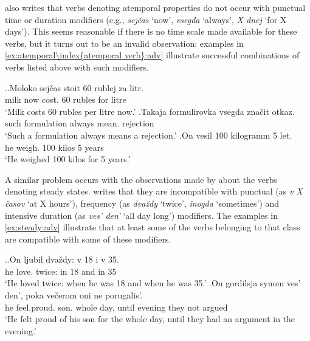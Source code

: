 \citet{Paducheva:96} also writes that verbs denoting atemporal properties do not occur with punctual time  or duration modifiers  (e.g., \textit{sej\v{c}as} `now', \textit{vsegda} `always', \textit{X dnej} `for X days'). This seems reasonable if there is no time scale made available for these verbs, but it turns out to be an invalid observation: examples in \ref{ex:atemporal\index{atemporal verb}:adv} illustrate successful combinations of verbs listed above with such modifiers.


\ex.\label{ex:atemporal\index{atemporal verb}:adv}\ag.Moloko sej\v{c}as stoit 60 rublej za litr.\\
milk now cost. 60 rubles for litre\\
\trans `Milk costs 60 rubles per litre now.'
\bg.Takaja formulirovka vsegda zna\v{c}it otkaz.\\
such formulation always mean. rejection\\
\trans `Such a formulation always means a rejection.'
\bg.On vesil 100 kilogramm 5 let.\\
he weigh. 100 kilos 5 years\\
\trans `He weighed 100 kilos for 5 years.'

A similar problem occurs with the observations made by \citet{Paducheva:96} about the verbs denoting steady states. \citet{Paducheva:96} writes that they are incompatible with punctual (as \textit{v X \v{c}asov} `at X hours'), frequency  (as \textit{dva\v{z}dy} `twice', \textit{inogda} `sometimes') and intensive duration (as \textit{ves' den'} `all day long') modifiers. The examples in \ref{ex:steady:adv} illustrate that at least some of the verbs belonging to that class are compatible with some of these modifiers.

\ex.\label{ex:steady:adv}\ag.On ljubil dva\v{z}dy: v 18 i v 35.\\
he love. twice: in 18 and in 35\\
\trans `He loved twice: when he was 18 and when he was 35.'
\bg.On gordilsja synom ves' den', poka ve\v{c}erom oni ne porugalis'.\\
he feel.proud. son. whole day, until evening they not argued\\
\trans `He felt proud of his son for the whole day, until they had an argument in the evening.'


